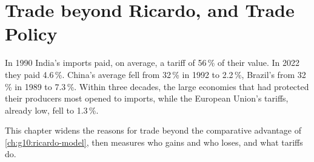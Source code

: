 \chapter{Trade beyond Ricardo, and Trade Policy}\label{ch:g12:trade-and-trade-policy}

In 1990 India's imports paid, on average, a tariff of 56\,\% of their value. In 2022 they paid 4.6\,\%. China's average fell from 32\,\% in 1992 to 2.2\,\%, Brazil's from 32\,\% in
1989 to 7.3\,\%. Within three decades, the large economies that had protected their producers most opened to imports, while the European Union's tariffs, already low,
fell to 1.3\,\%.

This chapter widens the reasons for trade beyond the comparative advantage of \cref{ch:g10:ricardo-model}, then measures who gains and who loses, and what tariffs do.

